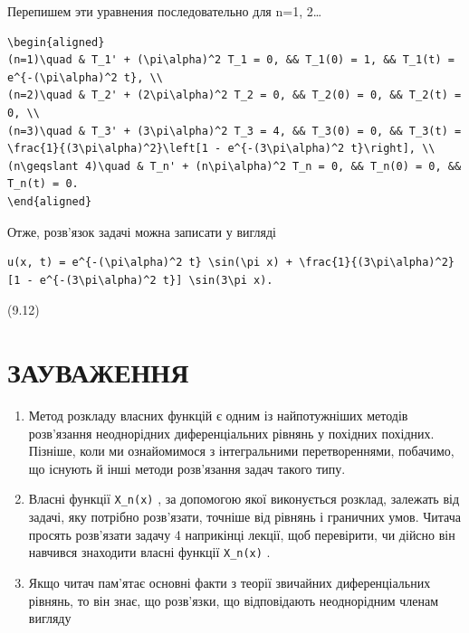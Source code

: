 \documentclass[
  ukrainian,
]{article}
\begin{document}
Перепишем эти уравнения последовательно для n=1, 2\ldots{}

\begin{verbatim}
\begin{aligned}
(n=1)\quad & T_1' + (\pi\alpha)^2 T_1 = 0, && T_1(0) = 1, && T_1(t) = e^{-(\pi\alpha)^2 t}, \\
(n=2)\quad & T_2' + (2\pi\alpha)^2 T_2 = 0, && T_2(0) = 0, && T_2(t) = 0, \\
(n=3)\quad & T_3' + (3\pi\alpha)^2 T_3 = 4, && T_3(0) = 0, && T_3(t) = \frac{1}{(3\pi\alpha)^2}\left[1 - e^{-(3\pi\alpha)^2 t}\right], \\
(n\geqslant 4)\quad & T_n' + (n\pi\alpha)^2 T_n = 0, && T_n(0) = 0, && T_n(t) = 0.
\end{aligned}
\end{verbatim}

Отже, розв'язок задачі можна записати у вигляді

\begin{verbatim}
u(x, t) = e^{-(\pi\alpha)^2 t} \sin(\pi x) + \frac{1}{(3\pi\alpha)^2} [1 - e^{-(3\pi\alpha)^2 t}] \sin(3\pi x).
\end{verbatim}

(9.12)

\section{ЗАУВАЖЕННЯ}\label{ux437ux430ux443ux432ux430ux436ux435ux43dux43dux44f-5}

\begin{enumerate}
\def\labelenumi{\arabic{enumi}.}
\item
  Метод розкладу власних функцій є одним із найпотужніших методів
  розв'язання неоднорідних диференціальних рівнянь у похідних похідних.
  Пізніше, коли ми ознайомимося з інтегральними перетвореннями,
  побачимо, що існують й інші методи розв'язання задач такого типу.
\item
  Власні функції \texttt{X\_n(x)} , за допомогою якої виконується
  розклад, залежать від задачі, яку потрібно розв'язати, точніше від
  рівнянь і граничних умов. Читача просять розв'язати задачу 4
  наприкінці лекції, щоб перевірити, чи дійсно він навчився знаходити
  власні функції \texttt{X\_n(x)} .
\item
  Якщо читач пам'ятає основні факти з теорії звичайних диференціальних
  рівнянь, то він знає, що розв'язки, що відповідають неоднорідним
  членам вигляду
\end{enumerate}
\end{document}
